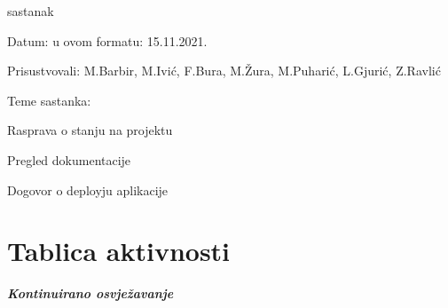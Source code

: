 \begin{packed_enum}
			\item  sastanak
			\item[] \begin{packed_item}
				\item Datum: u ovom formatu: 15.11.2021.
				\item Prisustvovali: M.Barbir, M.Ivić, F.Bura, M.Žura, M.Puharić, L.Gjurić, Z.Ravlić
				\item Teme sastanka:
				\begin{packed_item}
					\item  Rasprava o stanju na projektu
					\item  Pregled dokumentacije
					\item  Dogovor o deployju aplikacije 
				\end{packed_item}
			\end{packed_item}
			
			
		\end{packed_enum}
		
		\eject
		\section*{Tablica aktivnosti}
		
			\textbf{\textit{Kontinuirano osvježavanje}}\\
			

